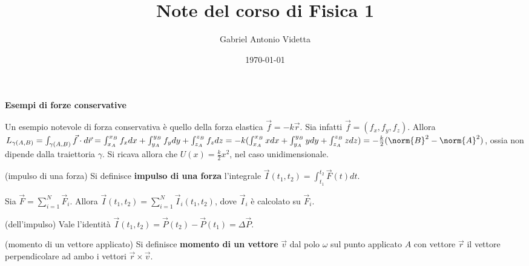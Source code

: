 \documentclass[11pt]{article}
\title{\textbf{Note del corso di Fisica 1}}
\author{Gabriel Antonio Videtta}
\date{\today}
\begin{document}
	
	\maketitle
	
	\begin{center}
		\Large \textbf{Esempi di forze conservative}
	\end{center}

	Un esempio notevole di forza conservativa è quello della
	forza elastica $\vec f = -k \vec r$. Sia infatti $\vec f = (f_x, f_y, f_z)$.
	Allora $L_{\gamma(A, B)} = \int_{\gamma(A, B)} \vec f \cdot d\vec r =
	\int_{x_A}^{x_B} f_x dx + \int_{y_A}^{y_B} f_y dy + \int_{z_A}^{z_B} f_z dz =
	-k (\int_{x_A}^{x_B} x dx + \int_{y_A}^{y_B} y dy + \int_{z_A}^{z_B} z dz) =
	-\frac{k}{2} (\norm{B}^2 - \norm{A}^2)$, ossia non dipende dalla traiettoria
	$\gamma$. Si ricava allora che $U(x) = \frac{k}{2} x ^2$, nel caso
	unidimensionale.
	
	
	\begin{definition} (impulso di una forza)
		Si definisce \textbf{impulso di una forza} l'integrale
		$\vec I(t_1, t_2) = \int_{t_1}^{t_2} \vec F(t) dt$.
	\end{definition}

	Sia $\vec F = \sum_{i=1}^N \vec F_i$. Allora $\vec I(t_1, t_2) =
	\sum_{i=1}^N \vec I_i(t_1, t_2)$, dove $\vec I_i$ è calcolato su $\vec F_i$.
	
	\begin{theorem} (dell'impulso)
		Vale l'identità $\vec I(t_1, t_2) = \vec P(t_2) - \vec P(t_1) = \Delta \vec P$.
	\end{theorem}

	\begin{definition} (momento di un vettore applicato)
		Si definisce \textbf{momento di un vettore} $\vec v$ dal polo
		$\omega$ sul punto applicato $A$ con vettore $\vec r$ il
		vettore perpendicolare ad ambo i vettori $\vec r \times \vec v$.
	\end{definition}
\end{document}
